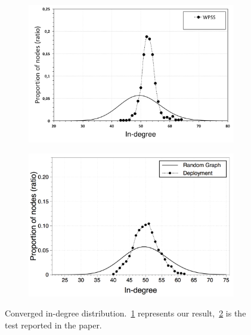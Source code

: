 \begin{figure}
\centering
\begin{subfigure}{.5\textwidth}
  \centering
  \includegraphics[keepaspectratio=true, width=1\linewidth]{images/converged_indegree}
  \caption{}
  \label{fig:converged_indegree}
\end{subfigure}%
\begin{subfigure}{.5\textwidth}
  \centering
  \includegraphics[keepaspectratio=true, width=1\linewidth]{images/paper_converged_indegree}
  \caption{}
  \label{fig:paper_converged_indegree}
\end{subfigure}
\caption{Converged in-degree distribution.~\ref{fig:converged_indegree} represents our result,~\ref{fig:paper_converged_indegree} is the test reported in the paper.}
\label{fig:randomness_conv_indegree}
\end{figure}

